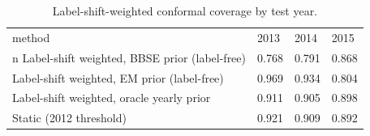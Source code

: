 \begin{table}[t]
\centering
\caption{Label-shift-weighted conformal coverage by test year.}
\label{tab:t4_label_shift_conformal}
\begin{tabular}{llll}
\toprule
method & 2013 & 2014 & 2015 \\n\midrule
Label-shift weighted, BBSE prior (label-free) & 0.768 & 0.791 & 0.868 \\
Label-shift weighted, EM prior (label-free) & 0.969 & 0.934 & 0.804 \\
Label-shift weighted, oracle yearly prior & 0.911 & 0.905 & 0.898 \\
Static (2012 threshold) & 0.921 & 0.909 & 0.892 \\
\bottomrule
\end{tabular}
\end{table}

